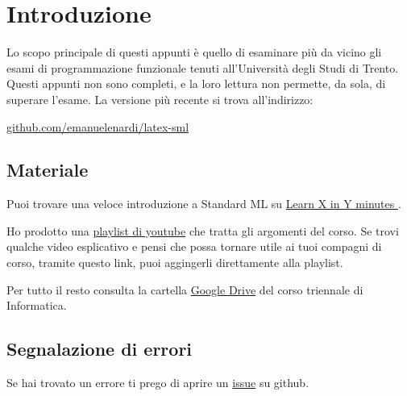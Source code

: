 \section*{Introduzione}

Lo scopo principale di questi appunti è quello di esaminare più da vicino gli esami di programmazione funzionale tenuti all'Università degli Studi di Trento. %
Questi appunti non sono completi, e la loro lettura non permette, da sola, di superare l’esame. %
La versione più recente si trova all'indirizzo:

\begin{center}
	\url{github.com/emanuelenardi/latex-sml}
\end{center}

%

%

\subsection*{Materiale}

Puoi trovare una veloce introduzione a Standard ML su \href{https://learnxinyminutes.com/docs/standard-ml/}{Learn X in Y minutes \ExternalLink}.

\smallskip
Ho prodotto una \href{bit.ly/sml-youtube-playlist}{playlist di youtube{\ExternalLink}} che tratta gli argomenti del corso.
Se trovi qualche video esplicativo e pensi che possa tornare utile ai tuoi compagni di corso, tramite questo link, puoi aggingerli direttamente alla playlist.

\smallskip
Per tutto il resto consulta la cartella \href{https://bit.ly/drive-folder}{Google Drive{\ExternalLink}} del corso triennale di Informatica.

\subsection*{Segnalazione di errori}

Se hai trovato un errore ti prego di aprire un \href{github.com/emanuelenardi/latex-sml/issues/new}{\textsf{issue}{\ExternalLink}} su  github.
